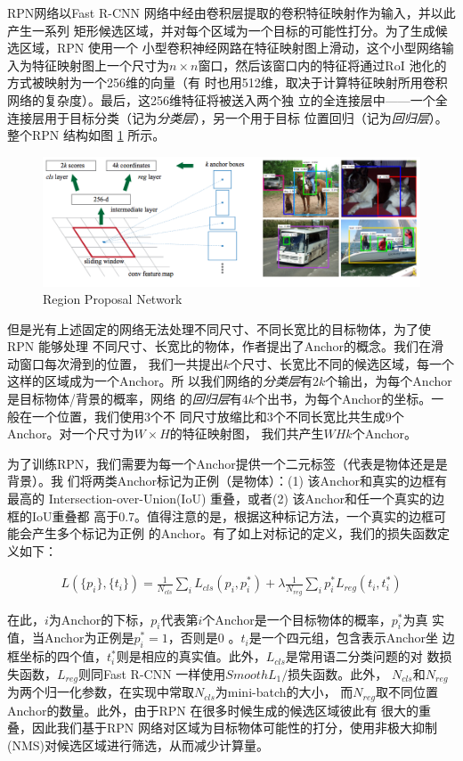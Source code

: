 RPN网络以Fast R-CNN 网络中经由卷积层提取的卷积特征映射作为输入，并以此产生一系列
矩形候选区域，并对每个区域为一个目标的可能性打分。为了生成候选区域，RPN 使用一个
小型卷积神经网路在特征映射图上滑动，这个小型网络输入为特征映射图上一个尺寸为$n
\times n$窗口，然后该窗口内的特征将通过RoI 池化的方式被映射为一个256维的向量（有
时也用512维，取决于计算特征映射所用卷积网络的复杂度）。最后，这256维特征将被送入两个独
立的全连接层中——一个全连接层用于目标分类（记为\textit{分类层}），另一个用于目标
位置回归（记为\textit{回归层}）。整个RPN 结构如图 \ref{Fig:RPN} 所示。

\begin{figure}[ht]
  \centering
  \includegraphics[width=0.8\linewidth]{./Figure/RPN.png}
  \caption{Region Proposal Network\cite{Ren:2015ug}}\label{Fig:RPN}
\end{figure}

但是光有上述固定的网络无法处理不同尺寸、不同长宽比的目标物体，为了使RPN 能够处理
不同尺寸、长宽比的物体，作者提出了Anchor的概念。我们在滑动窗口每次滑到的位置，
我们一共提出$k$个尺寸、长宽比不同的候选区域，每一个这样的区域成为一个Anchor。所
以我们网络的\textit{分类层}有$2k$个输出，为每个Anchor是目标物体/背景的概率，网络
的\textit{回归层}有$4k$个出书，为每个Anchor的坐标。一般在一个位置，我们使用3个不
同尺寸放缩比和3个不同长宽比共生成9个Anchor。对一个尺寸为$W \times H$的特征映射图，
我们共产生$WHk$个Anchor。

为了训练RPN，我们需要为每一个Anchor提供一个二元标签（代表是物体还是是背景）。我
们将两类Anchor标记为正例（是物体）：(1) 该Anchor和真实的边框有最高的
Intersection-over-Union(IoU) 重叠，或者(2) 该Anchor和任一个真实的边框的IoU重叠都
高于0.7。值得注意的是，根据这种标记方法，一个真实的边框可能会产生多个标记为正例
的Anchor。有了如上对标记的定义，我们的损失函数定义如下：

\begin{align}
L(\{p_i\}, \{t_i\}) = \frac{1}{N_{cls}}\sum_i{L_{cls}(p_i, p_i^*)} + \lambda\frac{1}{N_{reg}}\sum_i{p_i^*L_{reg}(t_i,t_i^*)}
\end{align}

在此，$i$为Anchor的下标，$p_i$代表第$i$个Anchor是一个目标物体的概率，$p_i^*$为真
实值，当Anchor为正例是$p_i^* = 1$，否则是0 。$t_i$是一个四元组，包含表示Anchor坐
边框坐标的四个值，$t_i^*$则是相应的真实值。此外，$L_{cls}$是常用语二分类问题的对
数损失函数，$L_{reg}$则同Fast R-CNN 一样使用$Smooth L_1/$损失函数。此外，
$N_{cls}$和$N_{reg}$为两个归一化参数，在实现中常取$N_{cls}$为mini-batch的大小，
而$N_{reg}$取不同位置Anchor的数量。此外，由于RPN 在很多时候生成的候选区域彼此有
很大的重叠，因此我们基于RPN 网络对区域为目标物体可能性的打分，使用非极大抑制
(NMS)对候选区域进行筛选，从而减少计算量。


